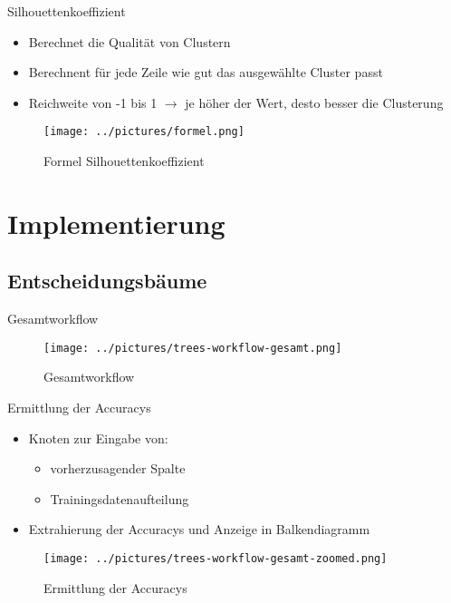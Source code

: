 \documentclass[
	handout,
  	aspectratio=169
]{beamer}
\begin{document}
		\begin{frame}{Silhouettenkoeffizient}
			\begin{itemize}
				\item Berechnet die Qualität von Clustern
				\item Berechnent für jede Zeile wie gut das ausgewählte Cluster passt
				\item Reichweite von -1 bis 1 $\rightarrow$ je höher der Wert, desto besser die Clusterung
			\end{itemize}
			\begin{center}
				\begin{figure}[h]
					\texttt{[image: ../pictures/formel.png]}
					\caption{Formel Silhouettenkoeffizient}		
				\end{figure}		
			\end{center}	
		\end{frame}
	
	\section{Implementierung}	
	\frame{\sectionpage}
	
		\subsection{Entscheidungsbäume}
			\begin{frame}{Gesamtworkflow}
				\begin{center}					
					\begin{figure}[h]
						\texttt{[image: ../pictures/trees-workflow-gesamt.png]}
						\caption{Gesamtworkflow}		
					\end{figure}	
				\end{center}	
			\end{frame}
			
			\begin{frame}{Ermittlung der Accuracys}
				\begin{itemize}
					\item Knoten zur Eingabe von:	
					\begin{itemize}
						\item vorherzusagender Spalte
						\item Trainingsdatenaufteilung
					\end{itemize}	
					\item Extrahierung der Accuracys und Anzeige in Balkendiagramm
				\end{itemize}
				\begin{center}					
					\begin{figure}[h]
						\texttt{[image: ../pictures/trees-workflow-gesamt-zoomed.png]}
						\caption{Ermittlung der Accuracys}		
					\end{figure}	
				\end{center}	
			\end{frame}
			
\end{document}
